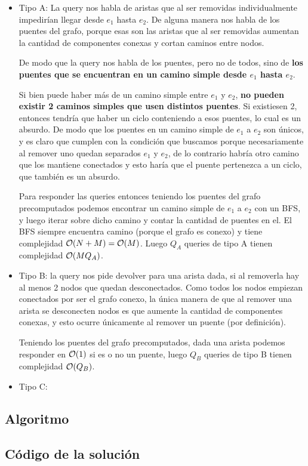 \begin{itemize}
\item Tipo A: La query nos habla de aristas que al ser removidas individualmente 
impedirían llegar desde $e_1$ hasta $e_2$. De alguna manera nos habla de los puentes 
del grafo, porque esas son las aristas que al ser removidas aumentan la cantidad de 
componentes conexas y cortan caminos entre nodos. 

De modo que la query nos habla de los 
puentes, pero no de todos, sino de \textbf{los puentes que se encuentran 
en un camino simple desde $e_1$ hasta $e_2$}. 

Si bien puede haber más de un camino simple entre $e_1$ y $e_2$, \textbf{no pueden 
existir 2 caminos simples que usen distintos puentes}. Si existiesen 2, entonces 
tendría que haber un ciclo conteniendo a esos puentes, lo cual es un absurdo. 
De modo que los puentes en un camino simple de $e_1$ a $e_2$ son únicos, y es 
claro que cumplen con la condición que buscamos porque necesariamente al remover 
uno quedan separados $e_1$ y $e_2$, de lo contrario habría otro camino que los 
mantiene conectados y esto haría que el puente pertenezca a un ciclo, que también 
es un absurdo. 

Para responder las queries entonces teniendo los puentes del grafo precomputados 
podemos encontrar un camino simple de $e_1$ a $e_2$ con un BFS, y luego 
iterar sobre dicho camino y contar la cantidad de puentes en el. El BFS 
siempre encuentra camino (porque el grafo es conexo) y tiene complejidad 
$\mathcal{O}(N+M) = \mathcal{O}(M)$. Luego $Q_A$ queries de tipo A tienen complejidad 
$\mathcal{O}(MQ_A)$. 

\item Tipo B: la query nos pide devolver para una arista dada, si al 
removerla hay al menos 2 nodos que quedan desconectados. Como todos 
los nodos empiezan conectados por ser el grafo conexo, la única manera de que 
al remover una arista se desconecten nodos es que aumente la cantidad de componentes 
conexas, y esto ocurre únicamente al remover un puente (por definición). 

Teniendo los puentes del grafo precomputados, dada una arista podemos responder 
en $\mathcal{O}(1)$ si es o no un puente, luego $Q_B$ queries de tipo B tienen complejidad 
$\mathcal{O}(Q_B)$. 

\item Tipo C:
\end{itemize}

\subsection{Algoritmo}
\newpage
\subsection{Código de la solución}


